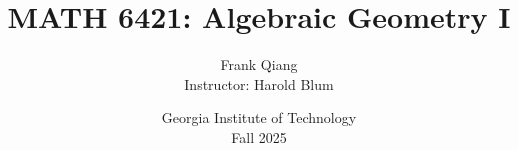 \documentclass[12pt, letterpaper, oneside]{book}
\title{MATH 6421: Algebraic Geometry I}
\author{Frank Qiang\\Instructor: Harold Blum}
\date{Georgia Institute of Technology\\Fall 2025}
\theoremstyle{definition}
\begin{document}
  \maketitle

  \begingroup
  \let\cleardoublepage\clearpage
  \tableofcontents
  \endgroup

  
  
  
  
  
  
  
  
  
  
  
  
\end{document}
